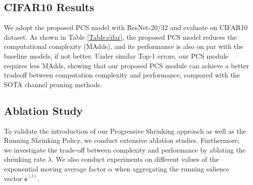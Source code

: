 \documentclass[lettersize,journal]{IEEEtran}
\begin{document}
\begin{table}[t]
\setlength{\tabcolsep}{0.6mm}
  \begin{center}
     \caption{Comparison of using Progressive Channel-Shrinking and using Truncation on PCS-ResNet18-B. Baseline denotes ResNet-18. $\uparrow$ and $\downarrow$ denote increasing and decreasing, respectively.
     }
     \label{Table:Truncation}
  \end{center}
  \vspace{-5mm}
\end{table}


\subsection{CIFAR10 Results}
We adopt the proposed PCS model with ResNet-20/32 and evaluate on CIFAR10 dataset.
As shown in Table \ref{Table:cifar}, the proposed PCS model reduces the computational complexity (MAdds), and its performance is also on par with the baseline models, if not better. 
Under similar Top-1 errors, our PCS module requires less MAdds, showing that our proposed PCS module can achieve a better tradeoff between computation complexity and performance, compared with the SOTA channel pruning methods.


\subsection{Ablation Study}
\label{sec: Ablation Study}
To validate the introduction of our Progressive Shrinking approach as well as the Running Shrinking Policy, we conduct extensive ablation studies. Furthermore, we investigate the trade-off between complexity and performance by ablating the shrinking rate $\lambda$. We also conduct experiments on different values of the exponential moving average factor $\alpha$ when aggregating the running salience vector $\overline{\boldsymbol{s}}^{(l)}$.
\end{document}
